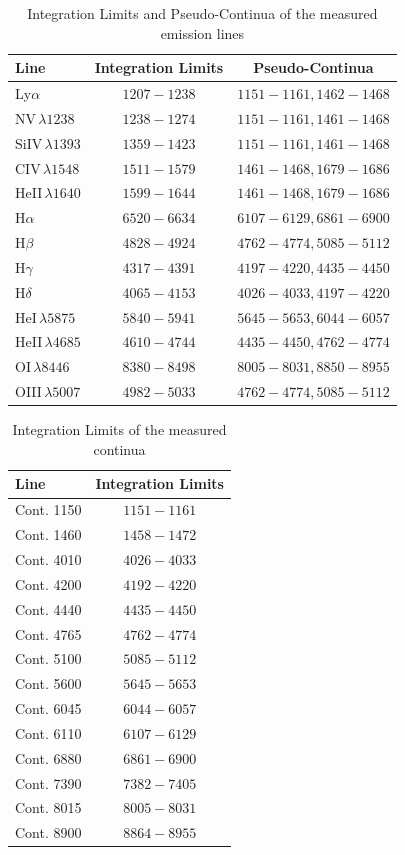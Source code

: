 \begin{table}[h!]
	\centering
	\small
	\caption{Integration Limits and Pseudo-Continua of the measured emission lines}
	\label{tab:emission_lines}
	\begin{tabular}{lcc}
		\hline
		\hline
		\textbf{Line} & \textbf{Integration Limits} & \textbf{Pseudo-Continua}  \\
		\hline
		Ly$\alpha$ & $1207-1238$ & $1151-1161, 1462-1468$\\
		NV$\,\lambda 1238$ & $1238-1274$ & $1151-1161, 1461-1468$ \\
		SiIV$\,\lambda 1393$ & $1359-1423$ & $1151-1161, 1461-1468$ \\
		CIV$\,\lambda 1548$ & $1511-1579$ & $1461-1468, 1679-1686$ \\
		HeII$\,\lambda 1640$& $1599-1644$ & $1461-1468, 1679-1686$ \\
		\hline
		H$\alpha$ & $6520-6634$ & $6107-6129, 6861-6900$ \\
		H$\beta$ & $4828-4924$ & $4762-4774, 5085-5112$ \\
		H$\gamma$ & $4317-4391$ & $4197-4220, 4435-4450$ \\
		H$\delta$ & $4065-4153$ & $4026-4033, 4197-4220$ \\
		
		HeI$\,\lambda5875$ & $5840-5941$ & $5645-5653, 6044-6057$ \\
		HeII$\,\lambda4685$ & $4610-4744$ & $4435-4450, 4762-4774$ \\
		OI$\,\lambda 8446$ & $8380-8498$ & $8005-8031, 8850-8955$ \\
		\hline
		OIII$\,\lambda 5007$ & $4982-5033$ & $4762-4774, 5085-5112$ \\
		\hline
		\hline
	\end{tabular}
\end{table}

\begin{table}[h!]
	\centering
	\small
	\caption{Integration Limits of the measured continua}
	\label{tab:continua}
	\begin{tabular}{lc}
		\hline
		\hline
		\textbf{Line} & \textbf{Integration Limits}  \\
		\hline
		Cont. 1150 & $1151-1161$\\
		Cont. 1460 & $1458-1472$\\
		Cont. 4010 & $4026-4033$\\
		Cont. 4200 & $4192-4220$\\
		Cont. 4440 & $4435-4450$\\
		Cont. 4765 & $4762-4774$\\
		Cont. 5100 & $5085-5112$\\
		Cont. 5600 & $5645-5653$\\
		Cont. 6045 & $6044-6057$\\
		Cont. 6110 & $6107-6129$\\
		Cont. 6880 & $6861-6900$\\
		Cont. 7390 & $7382-7405$\\
		Cont. 8015 & $8005-8031$\\
		Cont. 8900 & $8864-8955$\\
		\hline
		\hline
	\end{tabular}
\end{table}

